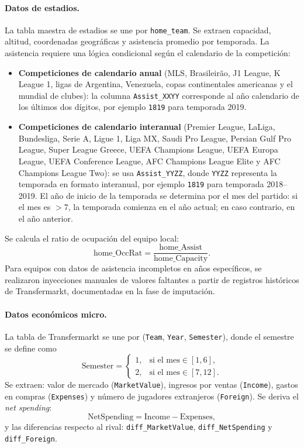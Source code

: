 \paragraph{Datos de estadios.} La tabla maestra de estadios se une por \texttt{home\_team}. Se extraen capacidad, altitud, coordenadas geogr\'aficas y asistencia promedio por temporada. La asistencia requiere una l\'ogica condicional seg\'un el calendario de la competici\'on:
\begin{itemize}
	\item \textbf{Competiciones de calendario anual} (MLS, Brasileir\~ao, J1 League, K League 1, ligas de Argentina, Venezuela, copas continentales americanas y el mundial de clubes): la columna \texttt{Assist\_XXYY} corresponde al a\~no calendario de los \'ultimos dos d\'igitos, por ejemplo \texttt{1819} para temporada 2019.
	\item \textbf{Competiciones de calendario interanual} (Premier League, LaLiga, Bundesliga, Serie A, Ligue 1, Liga MX, Saudi Pro League, Persian Gulf Pro League, Super League Greece, UEFA Champions League, UEFA Europa League, UEFA Conference League, AFC Champions League Elite y AFC Champions League Two): se usa \texttt{Assist\_YYZZ}, donde \texttt{YYZZ} representa la temporada en formato interanual, por ejemplo \texttt{1819} para temporada 2018--2019. El a\~no de inicio de la temporada se determina por el mes del partido: si el mes es $>7$, la temporada comienza en el a\~no actual; en caso contrario, en el a\~no anterior.
\end{itemize}
Se calcula el ratio de ocupaci\'on del equipo local:
\begin{equation}\label{eq:OccRat}
	\text{home\_OccRat} = \frac{\text{home\_Assist}}{\text{home\_Capacity}}.
\end{equation}
Para equipos con datos de asistencia incompletos en a\~nos espec\'ificos, se realizaron inyecciones manuales de valores faltantes a partir de registros hist\'oricos de Transfermarkt, documentadas en la fase de imputaci\'on.

\paragraph{Datos econ\'omicos micro.} La tabla de Transfermarkt se une por (\texttt{Team}, \texttt{Year}, \texttt{Semester}), donde el semestre se define como
\[
\text{Semester} = 
\begin{cases} 
	1, & \text{si el mes} \in [1,6], \\[4pt]
	2, & \text{si el mes} \in [7,12].
\end{cases}
\]
Se extraen: valor de mercado (\texttt{MarketValue}), ingresos por ventas (\texttt{Income}), gastos en compras (\texttt{Expenses}) y n\'umero de jugadores extranjeros (\texttt{Foreign}). Se deriva el \textit{net spending}:
\begin{equation}
	\text{NetSpending} = \text{Income} - \text{Expenses},
\end{equation}
y las diferencias respecto al rival: \texttt{diff\_MarketValue}, \texttt{diff\_NetSpending} y \texttt{diff\_Foreign}.

